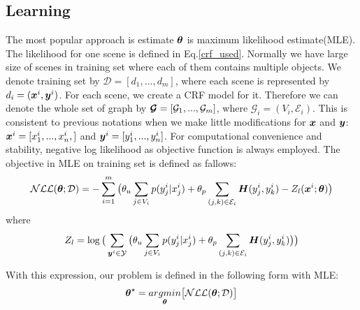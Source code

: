 \subsection{Learning}
The most popular approach is estimate $\boldsymbol \theta$ is maximum likelihood estimate(MLE). The likelihood for one scene is defined in Eq.\ref{crf_used}. Normally we have large size of scenes in training set where each of them contains multiple objects. We denote training set by $\mathcal{D} = [d_1, ..., d_m]$, where each scene is represented by $d_i = (\boldsymbol x^i, \boldsymbol y^i)$. For each scene, we create a CRF model for it. Therefore we can denote the whole set of graph by $\boldsymbol{\mathcal{G}}=[\mathcal{G}_1, ..., \mathcal{G}_m]$, where $\mathcal{G}_i = (V_i, \mathcal{E}_i)$. This is consistent to previous notations when we make little modifications for $\boldsymbol x$ and $\boldsymbol y$: $\boldsymbol x^i = [x^i_1, ..., x^i_n,]$ and $\boldsymbol y^i = [y^i_1, ..., y^i_n]$. For computational convenience and stability, negative log likelihood as objective function is always employed. The objective in MLE on training set is defined as fallows:
\begin{equation}
\label{crf_obj}
\mathcal{NLL}(\boldsymbol \theta; \mathcal{D}) = -\sum_{i=1}^{m}\big(\theta_u\sum_{j\in V_i} p(y_j^i|x_j^i) + \theta_p\sum_{(j,k)\in\mathcal{E}_i}\boldsymbol H(y_j^i, y_k^i)  - Z_l(\boldsymbol x^i; \boldsymbol \theta)\big)
\end{equation}     
where 
\begin{equation}
\label{log_partition_func}
Z_l = \log
\big(
\sum_{\boldsymbol y^i \in \mathcal{Y}} 
\big( 
\theta_u\sum_{j\in V_i}p(y_j^i|x_j^i) + \theta_p\sum_{(j,k)\in \mathcal{E}_i}\boldsymbol H(y_j^i, y_k^i) 
\big) 
\big)
\end{equation}

With this expression, our problem is defined in the following form with MLE:
\begin{equation}
\label{crf_nll_opt}
\boldsymbol \theta^\star = \underset{{\boldsymbol \theta}}{argmin} \big[\mathcal{NLL(\boldsymbol \theta; \mathcal{D})}\big]
\end{equation}

